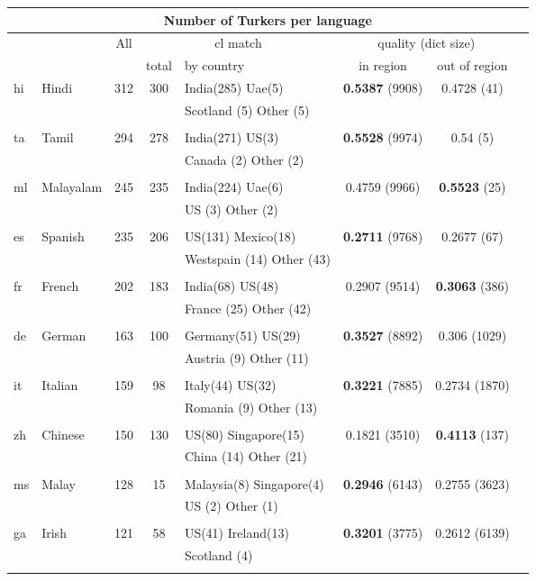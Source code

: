 \begin{figure}[h]
\centering
\begin{tabular}{llcclccc}
\multicolumn{8}{c}{Number of Turkers per language}\\
\hline\hline
&&All&\multicolumn{2}{c}{cl match}&\multicolumn{2}{c}{quality (dict size)}\\
&&&total&by country&in region&out of region\\
\hline\hline
hi&Hindi&312&300&India(285) Uae(5) &\textbf{0.5387} (9908)&0.4728 (41) \\
&&&&Scotland (5) Other (5) &&&\\
&&&&&&&\\
ta&Tamil&294&278&India(271) US(3) &\textbf{0.5528} (9974)&0.54 (5) \\
&&&&Canada (2) Other (2) &&&\\
&&&&&&&\\
ml&Malayalam&245&235&India(224) Uae(6) &0.4759 (9966)&\textbf{0.5523} (25)\\
&&&&US (3) Other (2) &&&\\
&&&&&&&\\
es&Spanish&235&206&US(131) Mexico(18) &\textbf{0.2711} (9768)&0.2677 (67) \\
&&&&Westspain (14) Other (43) &&&\\
&&&&&&&\\
fr&French&202&183&India(68) US(48) &0.2907 (9514)&\textbf{0.3063} (386)\\
&&&&France (25) Other (42) &&&\\
&&&&&&&\\
de&German&163&100&Germany(51) US(29) &\textbf{0.3527} (8892)&0.306 (1029) \\
&&&&Austria (9) Other (11) &&&\\
&&&&&&&\\
it&Italian&159&98&Italy(44) US(32) &\textbf{0.3221} (7885)&0.2734 (1870) \\
&&&&Romania (9) Other (13) &&&\\
&&&&&&&\\
zh&Chinese&150&130&US(80) Singapore(15) &0.1821 (3510)&\textbf{0.4113} (137)\\
&&&&China (14) Other (21) &&&\\
&&&&&&&\\
ms&Malay&128&15&Malaysia(8) Singapore(4) &\textbf{0.2946} (6143)&0.2755 (3623) \\
&&&&US (2) Other (1) &&&\\
&&&&&&&\\
ga&Irish&121&58&US(41) Ireland(13) &\textbf{0.3201} (3775)&0.2612 (6139) \\
&&&&Scotland (4) &&&\\
&&&&&&&\\
\hline\hline
\end{tabular}
\end{figure}
